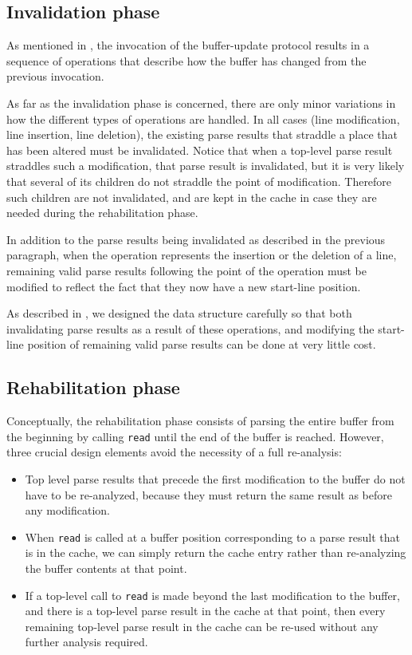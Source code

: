 \subsection{Invalidation phase}

As mentioned in , the invocation of
the buffer-update protocol results in a sequence of
operations that describe how the buffer has changed from the previous
invocation.

As far as the invalidation phase is concerned, there are only minor
variations in how the different types of operations are handled.  In
all cases (line modification, line insertion, line deletion), the
existing parse results that straddle a place that has been altered
must be invalidated.  Notice that when a top-level parse result
straddles such a modification, that parse result is invalidated, but
it is very likely that several of its children do not straddle the
point of modification.  Therefore such children are not invalidated,
and are kept in the cache in case they are needed during the
rehabilitation phase.

In addition to the parse results being invalidated as described in the
previous paragraph, when the operation represents the insertion or the
deletion of a line, remaining valid parse results following the point
of the operation must be modified to reflect the fact that they now
have a new start-line position.

As described in , we designed the
data structure carefully so that both invalidating parse results as a
result of these operations, and modifying the start-line position of
remaining valid parse results can be done at very little cost.

\subsection{Rehabilitation phase}

Conceptually, the rehabilitation phase consists of parsing the entire
buffer from the beginning by calling \texttt{read} until the end of
the buffer is reached.  However, three crucial design elements avoid
the necessity of a full re-analysis:

\begin{itemize}
\item Top level parse results that precede the first modification to
  the buffer do not have to be re-analyzed, because they must return
  the same result as before any modification.
\item When \texttt{read} is called at a buffer position corresponding
  to a parse result that is in the cache, we can simply return the
  cache entry rather than re-analyzing the buffer contents at that
  point.
\item If a top-level call to \texttt{read} is made beyond the last
  modification to the buffer, and there is a top-level parse result in
  the cache at that point, then every remaining top-level parse result
  in the cache can be re-used without any further analysis required.
\end{itemize}
